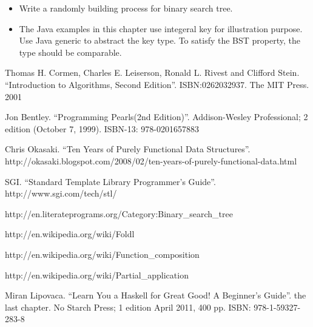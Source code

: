 \documentclass{article}
\begin{document}
\begin{Exercise}

\begin{itemize}
\item Write a randomly building process for binary search tree.
\item The Java examples in this chapter use integeral key for illustration purpose. Use Java generic to abstract the key type. To satisfy the BST property, the type should be comparable.
\end{itemize}

\end{Exercise}

\begin{thebibliography}{99}

Thomas H. Cormen, Charles E. Leiserson, Ronald L. Rivest and Clifford Stein.
``Introduction to Algorithms, Second Edition''. ISBN:0262032937. The MIT Press. 2001

Jon Bentley. ``Programming Pearls(2nd Edition)''. Addison-Wesley Professional; 2 edition (October 7, 1999). ISBN-13: 978-0201657883

Chris Okasaki. ``Ten Years of Purely Functional Data Structures''. http://okasaki.blogspot.com/2008/02/ten-years-of-purely-functional-data.html

SGI. ``Standard Template Library Programmer's Guide''. http://www.sgi.com/tech/stl/

http://en.literateprograms.org/Category:Binary\_search\_tree

http://en.wikipedia.org/wiki/Foldl

http://en.wikipedia.org/wiki/Function\_composition

http://en.wikipedia.org/wiki/Partial\_application

Miran Lipovaca. ``Learn You a Haskell for Great Good! A Beginner's Guide''. the last chapter. No Starch Press; 1 edition April 2011, 400 pp. ISBN: 978-1-59327-283-8

\end{thebibliography}

\ifx\wholebook\relax\else
\end{document}
